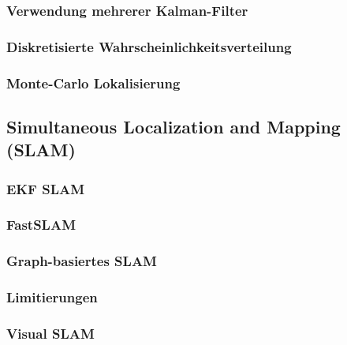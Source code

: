 \documentclass[a4paper, 11pt, accentcolor = tud3b]{tudreport}
\begin{document}
				\subsubsection{Verwendung mehrerer Kalman-Filter} %

				\subsubsection{Diskretisierte Wahrscheinlichkeitsverteilung} %

				\subsubsection{Monte-Carlo Lokalisierung} %

			\subsection{Simultaneous Localization and Mapping (SLAM)} %

				\subsubsection{EKF SLAM} %

				\subsubsection{FastSLAM} %

				\subsubsection{Graph-basiertes SLAM} %

				\subsubsection{Limitierungen} %

				\subsubsection{Visual SLAM} %
\end{document}
